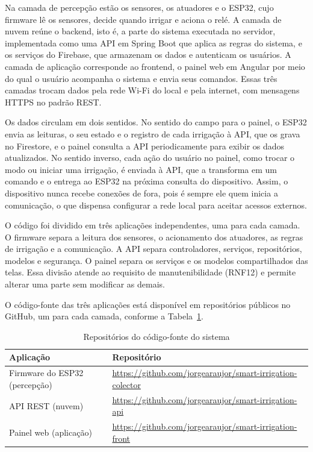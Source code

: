 Na camada de percepção estão os sensores, os atuadores e o ESP32, cujo firmware lê os sensores, decide quando irrigar e aciona o relé. A camada de nuvem reúne o backend, isto é, a parte do sistema executada no servidor, implementada como uma API em Spring Boot que aplica as regras do sistema, e os serviços do Firebase, que armazenam os dados e autenticam os usuários. A camada de aplicação corresponde ao frontend, o painel web em Angular por meio do qual o usuário acompanha o sistema e envia seus comandos. Essas três camadas trocam dados pela rede Wi-Fi do local e pela internet, com mensagens HTTPS no padrão REST.

Os dados circulam em dois sentidos. No sentido do campo para o painel, o ESP32 envia as leituras, o seu estado e o registro de cada irrigação à API, que os grava no Firestore, e o painel consulta a API periodicamente para exibir os dados atualizados. No sentido inverso, cada ação do usuário no painel, como trocar o modo ou iniciar uma irrigação, é enviada à API, que a transforma em um comando e o entrega ao ESP32 na próxima consulta do dispositivo. Assim, o dispositivo nunca recebe conexões de fora, pois é sempre ele quem inicia a comunicação, o que dispensa configurar a rede local para aceitar acessos externos.

O código foi dividido em três aplicações independentes, uma para cada camada. O firmware separa a leitura dos sensores, o acionamento dos atuadores, as regras de irrigação e a comunicação. A API separa controladores, serviços, repositórios, modelos e segurança. O painel separa os serviços e os modelos compartilhados das telas. Essa divisão atende ao requisito de manutenibilidade (RNF12) e permite alterar uma parte sem modificar as demais.

O código-fonte das três aplicações está disponível em repositórios públicos no GitHub, um para cada camada, conforme a Tabela~\ref{tab:repositorios}.

\begin{table}[!htbp]
  \centering
  \caption{Repositórios do código-fonte do sistema}
  \label{tab:repositorios}
  \small
  \renewcommand{\arraystretch}{1.2}
  \begin{tabularx}{\textwidth}{>{\raggedright\arraybackslash}p{3.6cm}
                               >{\raggedright\arraybackslash}X}
    \hline
    \textbf{Aplicação} & \textbf{Repositório} \\
    \hline
    Firmware do ESP32 (percepção) & \url{https://github.com/jorgearaujor/smart-irrigation-colector} \\
    API REST (nuvem) & \url{https://github.com/jorgearaujor/smart-irrigation-api} \\
    Painel web (aplicação) & \url{https://github.com/jorgearaujor/smart-irrigation-front} \\
    \hline
  \end{tabularx}
\end{table}

